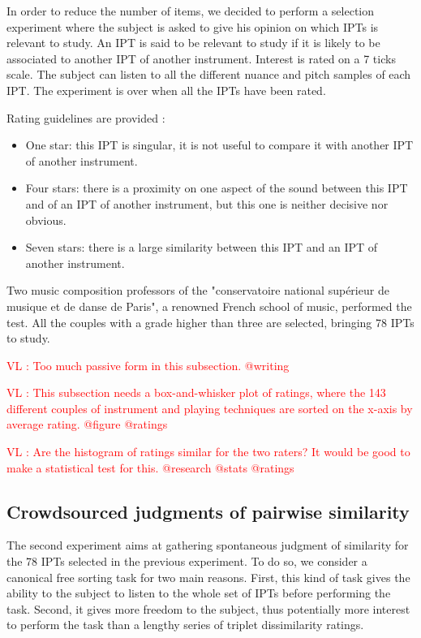 \documentclass{article}
\newcommand{\ipt}{IPT\xspace}
\newcommand{\ipts}{IPTs\xspace}
\newcommand{\vl}[1]{\textcolor{red}{VL : #1}}
\begin{document}
In order to reduce the number of items, we decided to perform a selection
experiment where the subject is asked to give his opinion on which
\ipts is relevant to study. An \ipt is said to be relevant to study
if it is likely to be associated to another \ipt of another instrument.
Interest is rated on a 7 ticks scale. The subject can listen to all the different
nuance and pitch samples of each \ipt. The experiment is over when all the
\ipts have been rated.

Rating guidelines are provided :
\begin{itemize}
  \item One star: this \ipt is singular, it is not useful to compare it with another \ipt of another instrument.
  \item Four stars: there is a proximity on one aspect of the sound between this
  \ipt and of an \ipt of another instrument,
  but this one is neither decisive nor obvious.
  \item Seven stars: there is a large similarity between this \ipt and an \ipt of another instrument.
\end{itemize}

Two music composition professors of the
"conservatoire national sup\'erieur de musique et de danse de Paris",
a renowned French school of music, performed the test.
All the couples with a grade higher than three are selected,
bringing 78 \ipts to study.

\vl{Too much passive form in this subsection. @writing}

\vl{This subsection needs a box-and-whisker plot of ratings, where the 143 different
couples of instrument and playing techniques are sorted on the x-axis by average rating. @figure @ratings}

\vl{Are the histogram of ratings similar for the two raters? It would be good to make a statistical test for this. @research @stats @ratings}

\subsection{Crowdsourced judgments of pairwise similarity}

The second experiment aims at gathering spontaneous judgment of similarity for the 78 \ipts selected in the previous experiment. To do so, we consider a canonical free sorting task for two main reasons. First, this kind of task gives the ability to the subject to listen to the whole set of \ipts before performing the task. Second, it gives more freedom to the subject, thus potentially more interest to perform the task than a lengthy series of triplet dissimilarity ratings.
\end{document}
